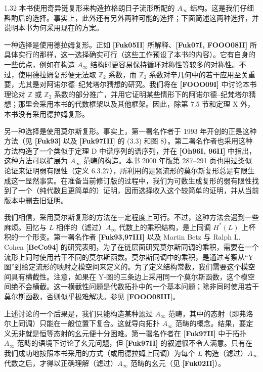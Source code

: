 \begin{remark}{1.32}\label{rem:1-32}
本书使用奇异链复形来构造拉格朗日子流形所配的 $A_\infty$ 结构。这是我们仔细斟酌后的选择。事实上，此外还有另外两种可能的选择；下面简述这两种选择，并说明本书为何采用现在的方案。

一种选择是使用德拉姆复形。正如 \textbf{[Fuk05II]} 所解释、\textbf{[Fuk07I, FOOO08II]} 所具体实行的那样，这一选择确实可行（这些工作预设了本书的内容）。它有自身的一些优点，例如在构造 $A_\infty$ 结构时更容易保持循环对称性等较多的对称性。不过，使用德拉姆复形便无法取 $\mathbb Z_2$ 系数，而 $\mathbb Z_2$ 系数对辛几何中的若干应用至关重要，尤其是对阿诺尔德--纪梵塔尔猜想的研究。我们将在 \textbf{[FOOO09I]} 中讨论本书理论对 $\mathbb Z$ 或 $\mathbb Z_2$ 系数的部分推广，并用它证明某些情形下的阿诺尔德--纪梵塔尔猜想；那里会采用本书的代数框架以及其他框架。因此，除第 7.5 节和定理 X 外，本书没有采用德拉姆复形。

另一种选择是使用莫尔斯复形。事实上，第一署名作者于 1993 年开创的正是这种方法（见 \textbf{[Fuk93]} 以及 \textbf{[Fuk97III]} 的 (3.3) 和图 8）。第二署名作者也采用这种方法构造了一个类似于定理 D 中谱序列的谱序列，并在 \textbf{[Oh96I, 96II]} 中指出，这种方法可以扩展为 $A_\infty$ 范畴的构造。本书 2000 年版第 287--291 页也用过类似论证来证明弱有限性（定义 6.3.27），所利用的是紧流形的莫尔斯复形总是有限生成这一显然事实。在准备当前修订版的过程中，我们为可数生成复形的弱有限性找到了一个（纯代数且更简单的）证明，因而选择收入这个较简单的证明，并从当前版本中删去旧证明。

我们相信，采用莫尔斯复形的方法在一定程度上可行。不过，这种方法会遇到一些麻烦。回忆与 $L$ 相伴的（滤过）$A_\infty$ 代数上的乘积结构，是上同调 $H^*(L)$ 上杯积的一个形变。第一署名作者 \textbf{[Fuk93,97III]} 以及 Martin Betz 与 Ralph L. Cohen \textbf{[BeCo94]} 的研究表明，为了在链层面研究莫尔斯同调的乘积，需要在一个流形上同时使用若干不同的莫尔斯函数。莫尔斯同调中的乘积，是通过考察从“Y-图”到给定流形的映射之模空间来定义的。为了定义结构常数，我们需要这个模空间具有横截性。注意，如果在 Y-图的三条边上采用同一个莫尔斯函数，这个模空间绝不会横截。这一横截性问题是代数拓扑中的一个基本问题；除非同时使用若干莫尔斯函数，否则似乎极难解决。参见 \textbf{[FOOO08III]}。

上述讨论的一个后果是，我们只能构造某种滤过 $A_\infty$ 范畴，其中的态射（即弗洛尔上同调）只能在一般位置下复合。这就导向拓扑 $A_\infty$ 范畴的概念。结果，要定义无非就是恒等态射的幺元便十分困难。第一署名作者在 \textbf{[Fuk97II]} 中于拓扑 $A_\infty$ 范畴的语境下讨论了幺元问题，但 \textbf{[Fuk97II]} 的叙述很不令人满意。只有在我们成功地按照本书采用的方式（或用德拉姆上同调）为每个 $L$ 构造（滤过）$A_\infty$ 代数之后，才得以正确理解（滤过）$A_\infty$ 范畴的幺元（见 \textbf{[Fuk02II]}）。


\end{remark}
